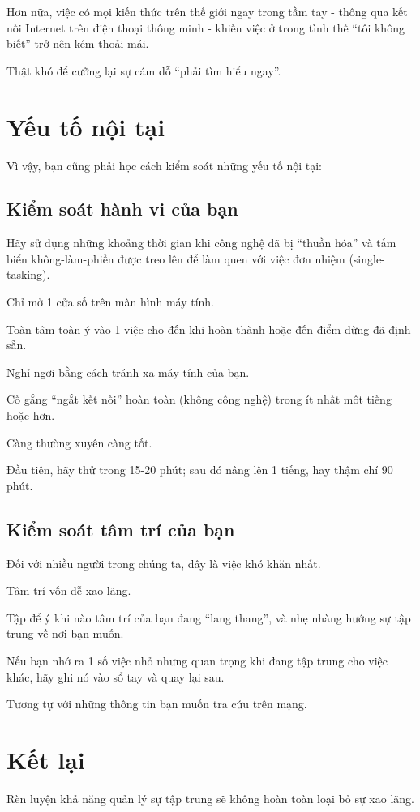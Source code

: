\documentclass{book}
\numberwithin{equation}{section}
\begin{document}
%
Hơn nữa, việc có mọi kiến thức trên thế giới ngay trong tầm tay - thông qua kết nối Internet trên điện thoại thông minh - khiến việc ở trong tình thế ``tôi không biết'' trở nên kém thoải mái.

Thật khó để cưỡng lại sự cám dỗ ``phải tìm hiểu ngay''.

\section{Yếu tố nội tại}
Vì vậy, bạn cũng phải học cách kiểm soát những yếu tố nội tại:

\subsection{Kiểm soát hành vi của bạn}
Hãy sử dụng những khoảng thời gian khi công nghệ đã bị ``thuần hóa'' và tấm biển không-làm-phiền được treo lên để làm quen với việc đơn nhiệm (single-tasking).

Chỉ mở 1 cửa số trên màn hình máy tính.

Toàn tâm toàn ý vào 1 việc cho đến khi hoàn thành hoặc đến điểm dừng đã định sẵn.

Nghỉ ngơi bằng cách tránh xa máy tính của bạn.

Cố gắng ``ngắt kết nối'' hoàn toàn (không công nghệ) trong ít nhất môt tiếng hoặc hơn.

Càng thường xuyên càng tốt.

Đầu tiên, hãy thử trong 15-20 phút; sau đó nâng lên 1 tiếng, hay thậm chí 90 phút.

\subsection{Kiểm soát tâm trí của bạn}
Đối với nhiều người trong chúng ta, đây là việc khó khăn nhất.

Tâm trí vốn dễ xao lãng.

Tập để ý khi nào tâm trí của bạn đang ``lang thang'', và nhẹ nhàng hướng sự tập trung về nơi bạn muốn.

Nếu bạn nhớ ra 1 số việc nhỏ nhưng quan trọng khi đang tập trung cho việc khác, hãy ghi nó vào sổ tay và quay lại sau.

Tương tự với những thông tin bạn muốn tra cứu trên mạng.

\section{Kết lại}
Rèn luyện khả năng quản lý sự tập trung sẽ không hoàn toàn loại bỏ sự xao lãng.
\end{document}
